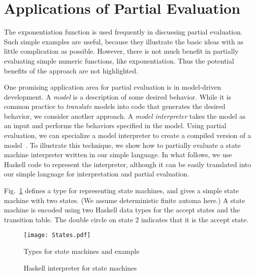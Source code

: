 \documentclass{eptcs}
\begin{document}
\section{Applications of Partial Evaluation}

The exponentiation function is used frequently in discussing partial
evaluation. Such simple examples are useful, because they illustrate
the basic ideas with as little complication as possible. However,
there is not much benefit in partially evaluating simple numeric
functions, like exponentiation. Thus the potential benefits of the
approach are not highlighted.

One promising application area for partial evaluation is in model-driven
development. A \textit{model} is a description of some desired behavior.
While it is common practice to \textit{translate} models into code that
generates the desired behavior, we consider another approach.
A \textit{model interpreter} takes the model as an input and performs
the behaviors specified in the model. Using partial evaluation, we can
specialize a model interpreter to create a compiled 
version of a model~\cite{Futamura+71}.
To illustrate this technique, we show how to partially evaluate
a state machine interpreter written in our simple language.
In what follows, we use Haskell code to represent the interpreter,
although it can be easily translated into our simple language for
interpretation and partial evaluation.

Fig.~\ref{dfaex} defines a type for representing state machines, and
gives a simple state machine with two states. (We assume deterministic
finite automa here.) A state machine is encoded using two Haskell data
types for the accept states and the transition table. The double
circle on state 2 indicates that it is the accept state.

\begin{figure}[t!]
 \begin{center}
\texttt{[image: States.pdf]}
\end{center}
 \caption{Types for state machines and example\label{dfaex}}
\bigskip
\end{figure}

\begin{figure}[t!]
 \caption{Haskell interpreter for state machines\label{dfaint}}
\bigskip
\end{figure}
\end{document}
